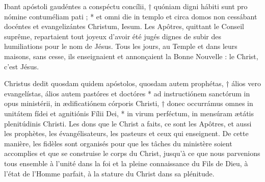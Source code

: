 \documentclass[Session2024.tex]{subfiles}
\begin{document}
{Ibant apóstoli gaudéntes a conspéctu concílii, † quóniam digni hábiti
sunt pro nómine contuméliam pati ; * et omni die in templo et circa
domos non cessábant docéntes et evangelizántes Christum, Iesum.}
{Les Apôtres, quittant le Conseil suprême, repartaient tout joyeux d’avoir
été jugés dignes de subir des humiliations pour le nom de Jésus. Tous
les jours, au Temple et dans leurs maisons, sans cesse, ils enseignaient
et annonçaient la Bonne Nouvelle : le Christ, c’est Jésus.}











{Christus dedit quosdam quidem apóstolos, quosdam autem
prophétas, † álios vero evangelístas, álios autem pastóres et doctóres *
ad instructiónem sanctórum in opus ministérii, in ædificatiónem córporis
Christi, † donec occurrámus omnes in unitátem fídei et agnitiónis Fílii
Dei, * in virum perféctum, in mensúram ætátis plenitúdinis Christi.}
{Les dons que le Christ a faits, ce sont les Apôtres, et aussi les prophètes,
les évangélisateurs, les pasteurs et ceux qui enseignent. De cette
manière, les fidèles sont organisés pour que les tâches du ministère
soient accomplies et que se construise le corps du Christ, jusqu’à ce
que nous parvenions tous ensemble à l’unité dans la foi et la pleine
connaissance du Fils de Dieu, à l’état de l’Homme parfait, à la stature
du Christ dans sa plénitude.}
\end{document}
